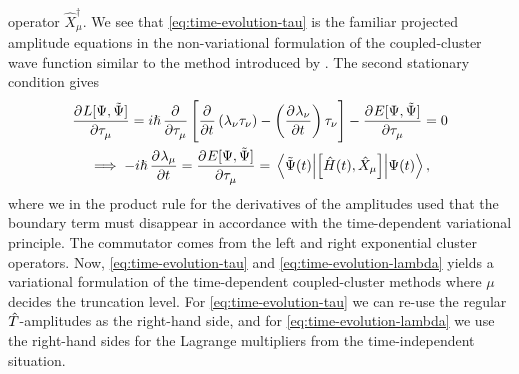         operator $\hat{X}^{\dagger}_{\mu}$.
        We see that \autoref{eq:time-evolution-tau} is the familiar projected
        amplitude equations in the non-variational formulation of the
        coupled-cluster wave function similar to the method introduced by
        \citeauthor{tdcc-hoodbhoy} \cite{tdcc-hoodbhoy, tdcc-hoodbhoy-2}.
        The second stationary condition gives
        \begin{gather}
            \dpd{L[\Psi, \tilde{\Psi}]}{\clustamp_{\mu}}
            = i\hslash\dpd{}{\clustamp_{\mu}}\brak{
                \dpd{}{t}\para{
                    \clustlamp_{\nu}
                    \clustamp_{\nu}
                }
                - \para{\dpd{\clustlamp_{\nu}}{t}}
                \clustamp_{\nu}
            }
            - \dpd{E[\Psi, \tilde{\Psi}]}{\clustamp_{\mu}}
            = 0 \\
            \implies
            -i\hslash\dpd{\clustlamp_{\mu}}{t}
            =
            \dpd{E[\Psi, \tilde{\Psi}]}{\clustamp_{\mu}}
            =
            \mel{\tilde{\Psi}(t)}{
                \com{\hamil(t)}{\hat{X}_{\mu}}
            }{\Psi(t)},
            \label{eq:time-evolution-lambda}
        \end{gather}
        where we in the product rule for the derivatives of the amplitudes used
        that the boundary term must disappear in accordance with the
        time-dependent variational principle.
        The commutator comes from the left and right exponential cluster
        operators.
        Now, \autoref{eq:time-evolution-tau} and
        \autoref{eq:time-evolution-lambda} yields a variational formulation of
        the time-dependent coupled-cluster methods where $\mu$ decides the
        truncation level.
        For \autoref{eq:time-evolution-tau} we can re-use the regular
        $\hat{T}$-amplitudes as the right-hand side, and for
        \autoref{eq:time-evolution-lambda} we use the right-hand sides for the
        Lagrange multipliers from the time-independent situation.

